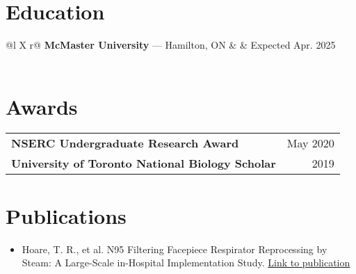 \documentclass[a4paper,12pt]{article}
\begin{document}
\section{Education}
\begin{tabularx}{\linewidth}{@{}l X r@{}}
\textbf{McMaster University} — Hamilton, ON & & Expected Apr. 2025 \\
\\
\end{tabularx}

\section{Awards}
\begin{tabularx}{\linewidth}{@{}l r@{}} 
\textbf{NSERC Undergraduate Research Award} & \hfill May 2020 \\
\textbf{University of Toronto National Biology Scholar} & \hfill 2019 \\
\end{tabularx}

\section{Publications}
\begin{itemize}[nosep,after=\strut, leftmargin=1em, itemsep=3pt,label=--]
\item Hoare, T. R., et al. N95 Filtering Facepiece Respirator Reprocessing by Steam: A Large-Scale in-Hospital Implementation Study. \href{https://www.sciencedirect.com/science/article/pii/S0195670120304576#!}{Link to publication}
\end{itemize}

\vfill
{}
\end{document}
